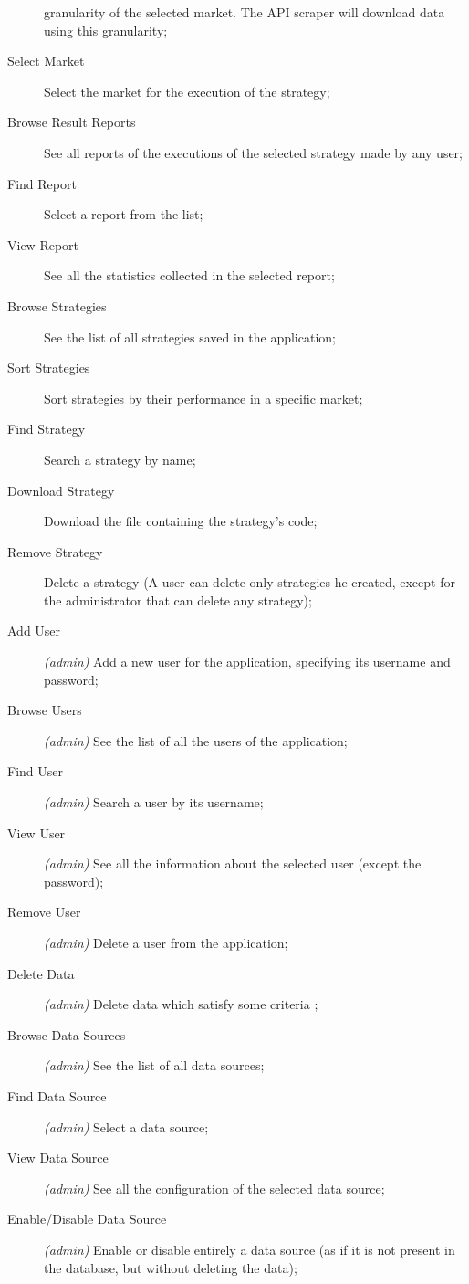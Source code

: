 \begin{description}
		granularity of the selected market. The API scraper will
		download data using this granularity;
	\item[Select Market] Select the market for the execution of the
		strategy;
	\item[Browse Result Reports] See all reports of the executions of the
		selected strategy made by any user;
	\item[Find Report] Select a report from the list;
	\item[View Report] See all the statistics collected in the selected
		report;
	\item[Browse Strategies] See the list of all strategies saved in the
		application;
	\item[Sort Strategies] Sort strategies by their performance in a
		specific market;
	\item[Find Strategy] Search a strategy by name;
	\item[Download Strategy] Download the file containing the strategy's
		code;
	\item[Remove Strategy] Delete a strategy (A user can delete only
		strategies he created, except for the administrator that can
		delete any strategy);
	\item[Add User] \textit{(admin)} Add a new user for the application,
		specifying its username and password;
	\item[Browse Users] \textit{(admin)} See the list of all the users of
		the application;
	\item[Find User] \textit{(admin)} Search a user by its username;
	\item[View User] \textit{(admin)} See all the information about the
		selected user (except the password);
	\item[Remove User] \textit{(admin)} Delete a user from the application;
	\item[Delete Data] \textit{(admin)} Delete data which satisfy some
		criteria ;
	\item[Browse Data Sources] \textit{(admin)} See the list of all data
		sources;
	\item[Find Data Source] \textit{(admin)} Select a data source;
	\item[View Data Source] \textit{(admin)} See all the configuration of
		the selected data source;
	\item[Enable/Disable Data Source] \textit{(admin)} Enable or disable
		entirely a data source (as if it is not present in the database,
		but without deleting the data);
\end{description}
